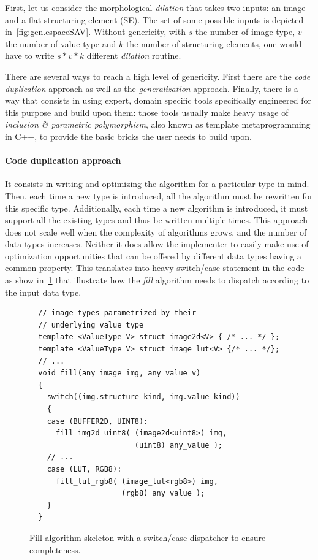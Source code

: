 First, let us consider the morphological \emph{dilation} that takes two inputs: an image and a flat structuring element
(SE). The set of some possible inputs is depicted in~\cref{fig:gen.espaceSAV}. Without genericity, with \(s\) the number
of image type, \(v\) the number of value type and \(k\) the number of structuring elements, one would have to write \(s
* v * k\) different \emph{dilation} routine.

There are several ways to reach a high level of genericity. First there are the \emph{code duplication} approach as well
as the \emph{generalization} approach. Finally, there is a way that consists in using expert, domain specific tools
specifically engineered for this purpose and build upon them: those tools usually make heavy usage of \emph{inclusion
  \& parametric polymorphism}, also known as template metaprogramming in C++, to provide the basic bricks the user needs
to build upon.

\paragraph{Code duplication approach} It consists in writing and optimizing the algorithm for a particular type in mind.
Then, each time a new type is introduced, all the algorithm must be rewritten for this specific type. Additionally, each
time a new algorithm is introduced, it must support all the existing types and thus be written multiple times. This
approach does not scale well when the complexity of algorithms grows, and the number of data types increases. Neither it
does allow the implementer to easily make use of optimization opportunities that can be offered by different data types
having a common property. This translates into heavy switch/case statement in the code as show in~\cref{code:gen.exhau}
that illustrate how the \emph{fill} algorithm needs to dispatch according to the input data type.

\begin{figure}[htbp]
  \centering
  \begin{verbatim}
  // image types parametrized by their
  // underlying value type
  template <ValueType V> struct image2d<V> { /* ... */ };
  template <ValueType V> struct image_lut<V> {/* ... */};
  // ...
  void fill(any_image img, any_value v)
  {
    switch((img.structure_kind, img.value_kind))
    {
    case (BUFFER2D, UINT8):
      fill_img2d_uint8( (image2d<uint8>) img,
                        (uint8) any_value );
    // ...
    case (LUT, RGB8):
      fill_lut_rgb8( (image_lut<rgb8>) img,
                     (rgb8) any_value );
    }
  }
  \end{verbatim}
  \caption{Fill algorithm skeleton with a switch/case dispatcher to ensure completeness.}
  \label{code:gen.exhau}
\end{figure}

